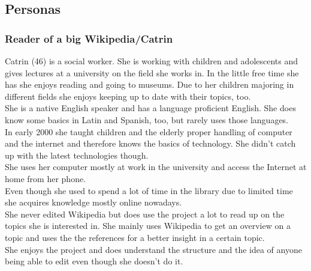 \documentclass[11pt]{article}
\begin{document}
\subsection{Personas}

\subsubsection{Reader of a big Wikipedia/Catrin}
Catrin (46) is a social worker. She is working with children and adolescents and gives lectures at a university on the field she works in. In the little free time she has she enjoys reading and going to museums. Due to her children majoring in different fields she enjoys keeping up to date with their topics, too. \\
She is a native English speaker and has a language proficient English. She does know some basics in Latin and Spanish, too, but rarely uses those languages. \\
In early 2000 she taught children and the elderly proper handling of computer and the internet and therefore knows the basics of technology. She didn't catch up with the latest technologies though. \\
She uses her computer mostly at work in the university and access the Internet at home from her phone. \\
Even though she used to spend a lot of time in the library due to limited time she acquires knowledge mostly online nowadays. \\
She never edited Wikipedia but does use the project a lot to read up on the topics she is interested in. She mainly uses Wikipedia to get an overview on a topic and uses the the references for a better insight in a certain topic. \\
She enjoys the project and does understand the structure and the idea of anyone being able to edit even though she doesn't do it. \\
\end{document}
